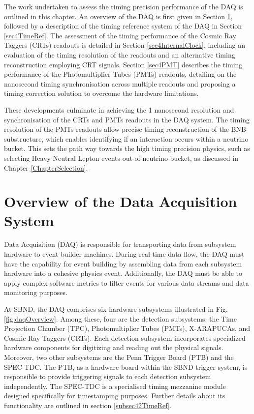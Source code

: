 The work undertaken to assess the timing precision performance of the DAQ is outlined in this chapter.
An overview of the DAQ is first given in Section \ref{sec4Overview}, followed by a description of the timing reference system of the DAQ in Section \ref{sec4TimeRef}. 
The assessment of the timing performance of the Cosmic Ray Taggers (CRTs) readouts is detailed in Section \ref{sec4InternalClock}, including an evaluation of the timing resolution of the readouts and an alternative timing reconstruction employing CRT signals. 
Section \ref{sec4PMT} describes the timing performance of the Photomultiplier Tubes (PMTs) readouts, detailing on the nanosecond timing synchronisation across multiple readouts and proposing a timing correction solution to overcome the hardware limitations. 

These developments culminate in achieving the 1 nanosecond resolution and synchronisation of the CRTs and PMTs readouts in the DAQ system. 
The timing resolution of the PMTs readouts allow precise timing reconstruction of the BNB substructure, which enables identifying if an interaction occurs within a neutrino bucket. 
This sets the path way towards the high timing precision physics, such as selecting Heavy Neutral Lepton events out-of-neutrino-bucket, as discussed in Chapter \ref{ChapterSelection}. 

\newpage
\section{Overview of the Data Acquisition System}
\label{sec4Overview}

Data Acquisition (DAQ) is responsible for transporting data from subsystem hardware to event builder machines.
During real-time data flow, the DAQ must have the capability for event building by assembling data from each subsystem hardware into a cohesive physics event. 
Additionally, the DAQ must be able to apply complex software metrics to filter events for various data streams and data monitoring purposes.

At SBND, the DAQ comprises six hardware subsystems illustrated in Fig. \ref{fig:daqOverview}.
Among these, four are the detection subsystems: the Time Projection Chamber (TPC), Photomultiplier Tubes (PMTs), X-ARAPUCAs, and Cosmic Ray Taggers (CRTs).
Each detection subsystem incorporates specialized hardware components for digitizing and reading out the physical signals. 
Moreover, two other subsystems are the Penn Trigger Board (PTB) \cite{ptb_gvs} and the SPEC-TDC. 
The PTB, as a hardware board within the SBND trigger system, is responsible to provide triggering signals to each detection subsystem independently.
The SPEC-TDC is a specialised timing mezzanine module designed specifically for timestamping purposes.
Further details about its functionality are outlined in section \ref{subsec42TimeRef}.

